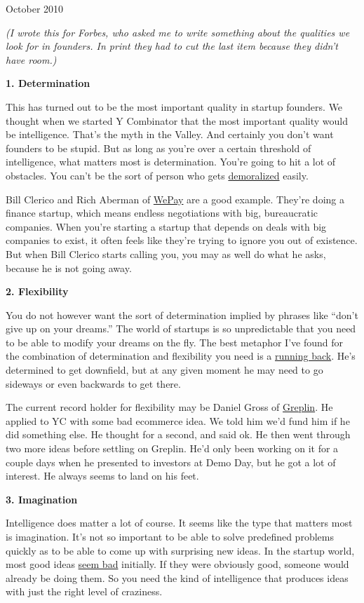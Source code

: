 October 2010

\emph{(I wrote this for Forbes, who asked me to write something about
the qualities we look for in founders. In print they had to cut the last
item because they didn't have room.)}

\textbf{1. Determination}

This has turned out to be the most important quality in startup
founders. We thought when we started Y Combinator that the most
important quality would be intelligence. That's the myth in the Valley.
And certainly you don't want founders to be stupid. But as long as
you're over a certain threshold of intelligence, what matters most is
determination. You're going to hit a lot of obstacles. You can't be the
sort of person who gets \href{die.html}{demoralized} easily.

Bill Clerico and Rich Aberman of \href{http://wepay.com}{WePay} are a
good example. They're doing a finance startup, which means endless
negotiations with big, bureaucratic companies. When you're starting a
startup that depends on deals with big companies to exist, it often
feels like they're trying to ignore you out of existence. But when Bill
Clerico starts calling you, you may as well do what he asks, because he
is not going away.

\textbf{2. Flexibility}

You do not however want the sort of determination implied by phrases
like ``don't give up on your dreams.'' The world of startups is so
unpredictable that you need to be able to modify your dreams on the fly.
The best metaphor I've found for the combination of determination and
flexibility you need is a \href{relres.html}{running back}. He's
determined to get downfield, but at any given moment he may need to go
sideways or even backwards to get there.

The current record holder for flexibility may be Daniel Gross of
\href{http://greplin.com}{Greplin}. He applied to YC with some bad
ecommerce idea. We told him we'd fund him if he did something else. He
thought for a second, and said ok. He then went through two more ideas
before settling on Greplin. He'd only been working on it for a couple
days when he presented to investors at Demo Day, but he got a lot of
interest. He always seems to land on his feet.

\textbf{3. Imagination}

Intelligence does matter a lot of course. It seems like the type that
matters most is imagination. It's not so important to be able to solve
predefined problems quickly as to be able to come up with surprising new
ideas. In the startup world, most good ideas \href{googles.html}{seem
bad} initially. If they were obviously good, someone would already be
doing them. So you need the kind of intelligence that produces ideas
with just the right level of craziness.

